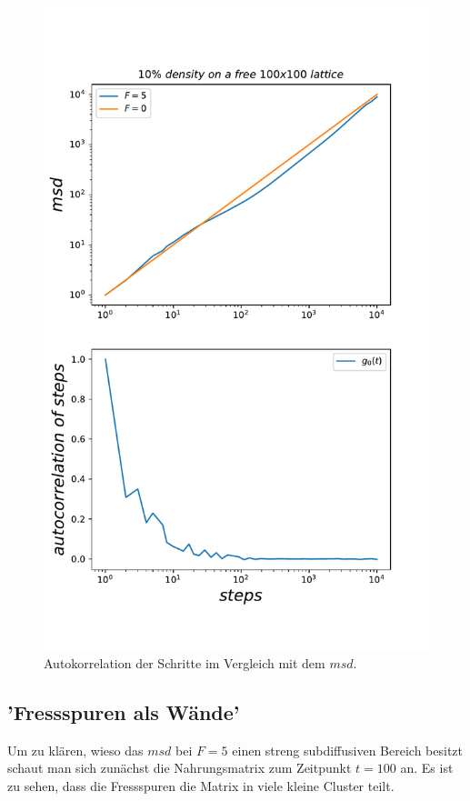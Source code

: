 \documentclass[a4paper, 12pt]{scrartcl}
\begin{document}
\begin{figure}[h!]
	\centering
	\includegraphics[scale=0.75]{autocorr.pdf}
	\caption{Autokorrelation der Schritte im Vergleich mit dem $msd$.}
\end{figure}

\clearpage

\subsection{'Fressspuren als Wände'}
Um zu klären, wieso das $msd$ bei $F=5$ einen streng subdiffusiven Bereich besitzt schaut man sich zunächst die Nahrungsmatrix zum Zeitpunkt $t=100$ an. Es ist zu sehen, dass die Fressspuren die Matrix in viele kleine Cluster teilt. 
\end{document}

